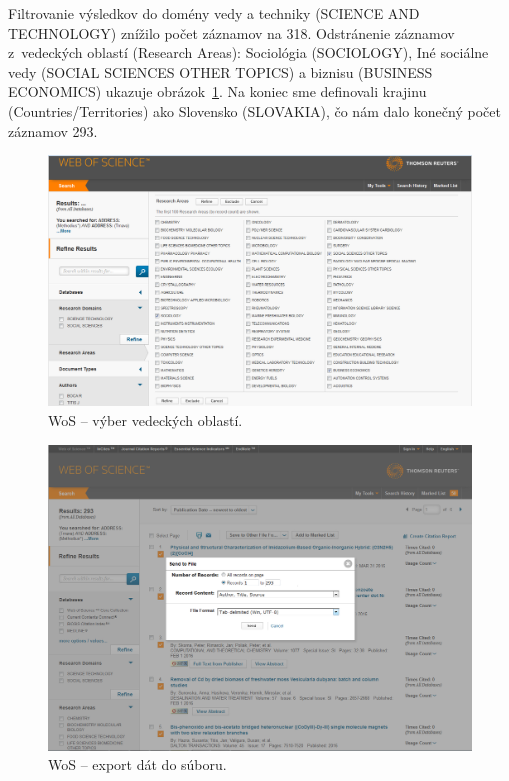 Filtrovanie výsledkov do domény vedy a techniky (SCIENCE AND TECHNOLOGY) znížilo
počet záznamov na 318.  Odstránenie záznamov z~vedeckých oblastí (Research
Areas): Sociológia (SOCIOLOGY), Iné sociálne vedy (SOCIAL SCIENCES OTHER TOPICS)
a biznisu (BUSINESS ECONOMICS) ukazuje obrázok~\ref{fig:wos.areaselection}.  Na
koniec sme definovali krajinu (Countries/Territories) ako Slovensko (SLOVAKIA),
čo nám dalo konečný počet záznamov 293.

\begin{figure}
  \centering
  \includegraphics[width=\textwidth]{obr/wos04-cut.jpg}
  \caption{WoS -- výber vedeckých oblastí.}
  \label{fig:wos.areaselection}
\end{figure}

\begin{figure}
  \centering
  \includegraphics[width=\textwidth]{obr/wos06-cut.jpg}
  \caption{WoS -- export dát do súboru.}
  \label{fig:wos.export}
\end{figure}

